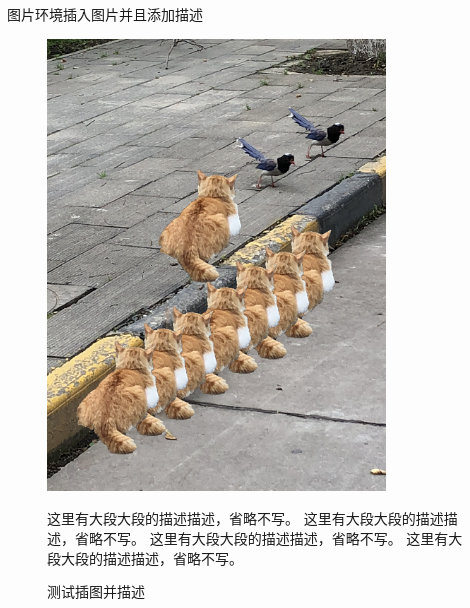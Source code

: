 \documentclass[no-math, compress]{beamer}
\begin{document}
\begin{frame}{图片环境}{插入图片并且添加描述}
    \begin{figure}
        \centering
        \begin{minipage}[t]{0.4\textwidth}
            \centering\vspace{0pt}
            \includegraphics[width=0.8\textwidth]{image01}
        \end{minipage}
        \qquad
        \begin{minipage}[t]{0.4\textwidth}
            \centering
            这里有大段大段的描述描述，省略不写。
            这里有大段大段的描述描述，省略不写。
            这里有大段大段的描述描述，省略不写。
            这里有大段大段的描述描述，省略不写。
        \end{minipage}
        \caption{测试插图并描述}
    \end{figure}
\end{frame}
\end{document}
